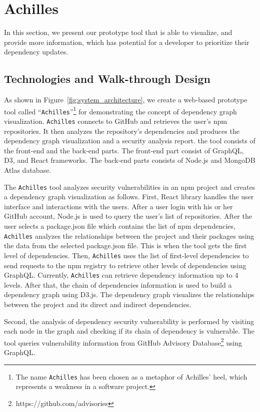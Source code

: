 \documentclass[conference]{IEEEtran}
\begin{document}
	\section{Achilles}
	In this section, we present our prototype tool that is able to visualize, and provide more information, which has potential for a developer to prioritize their dependency updates. 
	
	\subsection{Technologies and Walk-through Design}

	As shown in Figure~\ref{fig:system_architecture}, we create a web-based prototype tool called ``\texttt{Achilles}''\footnote{The name \texttt{Achilles} has been chosen as a metaphor of Achilles' heel, which represents a weakness in a software project.} for demonstrating the concept of dependency graph visualization. \texttt{Achilles} connects to GitHub and retrieves the user's npm repositories. It then analyzes the repository's dependencies and produces the dependency graph visualization and a security analysis report.  the tool consists of the front-end and the back-end parts. The front-end part consist of GraphQL, D3, and React frameworks. The back-end parts consists of Node.js and MongoDB Atlas database.

    The \texttt{Achilles} tool analyzes security vulnerabilities in an npm project and creates a dependency graph visualization as follows.
    First, React library handles the user interface and interactions with the users. After a user login with his or her GitHub account, Node.js is used to query the user's list of repositories. After the user selects a package.json file which contains the list of npm dependencies, \texttt{Achilles} analyzes the relationships between the project and their packages using the data from the selected package.json file. This is when the tool gets the first level of dependencies. Then, \texttt{Achilles}  uses the list of first-level dependencies to send requests to the npm registry to retrieve other levels of dependencies using GraphQL. Currently, \texttt{Achilles} can retrieve dependency information up to 4 levels.
    After that, the chain of dependencies information is used to build a dependency graph using D3.js. The dependency graph visualizes the relationships between the project and its direct and indirect dependencies.
    
    Second, the analysis of dependency security vulnerability is performed by visiting each node in the graph and checking if its chain of dependency is vulnerable. The tool queries vulnerability information from GitHub Advisory Database\footnote{https://github.com/advisories} using GraphQL. 
    
\end{document}
